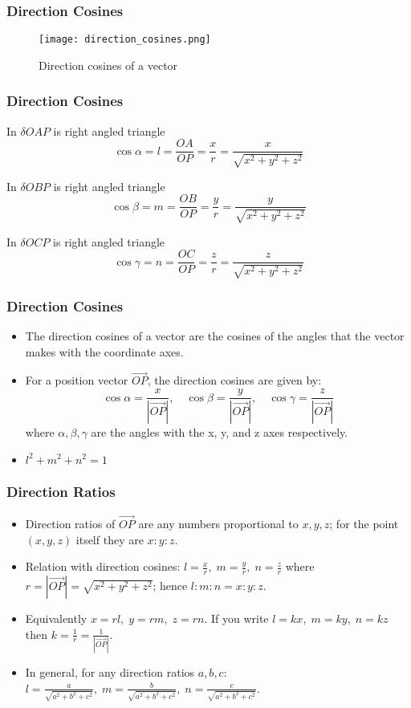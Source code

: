 \begin{frame}
    \frametitle{Direction Cosines}
    \begin{figure}
        \centering
        \texttt{[image: direction\_cosines.png]}
        \caption{Direction cosines of a vector}
    \end{figure}
\end{frame}

\begin{frame}
    \frametitle{Direction Cosines}
    In $\delta OAP$ is right angled triangle 
    \[
    \cos \alpha = l = \frac{OA}{OP}  = \frac{x}{r} = \frac{x}{\sqrt{x^2 + y^2 + z^2}}
    \] 

    In $\delta OBP$ is right angled triangle
    \[
    \cos \beta = m = \frac{OB}{OP}  = \frac{y}{r} = \frac{y}{\sqrt{x^2 + y^2 + z^2}}
    \]

    In $\delta OCP$ is right angled triangle
    \[
    \cos \gamma = n = \frac{OC}{OP}  = \frac{z}{r} = \frac{z}{\sqrt{x^2 + y^2 + z^2}}
    \]
\end{frame}

\begin{frame}
    \frametitle{Direction Cosines}
    \begin{itemize}
        \item The direction cosines of a vector are the cosines of the angles that the vector makes with the coordinate axes.
        \item For a position vector \(\vec{OP}\), the direction cosines are given by:
        \[
        \cos \alpha = \frac{x}{|\vec{OP}|}, \quad \cos \beta = \frac{y}{|\vec{OP}|}, \quad \cos \gamma = \frac{z}{|\vec{OP}|}
        \]
        where \(\alpha, \beta, \gamma\) are the angles with the x, y, and z axes respectively.
        \item \(l^{2} + m^{2} + n^{2} = 1\)
    \end{itemize}
\end{frame}

\begin{frame}
    \frametitle{Direction Ratios}
    \begin{itemize}
        \item Direction ratios of \(\vec{OP}\) are any numbers proportional to \(x,y,z\); for the point \((x,y,z)\) itself they are \(x:y:z\).
        \item Relation with direction cosines: \(l=\frac{x}{r},\; m=\frac{y}{r},\; n=\frac{z}{r}\) where \(r=|\vec{OP}|=\sqrt{x^{2}+y^{2}+z^{2}}\); hence \(l:m:n = x:y:z\).
        \item Equivalently \(x = r l,\; y = r m,\; z = r n\). If you write \(l = kx,\; m = ky,\; n = kz\) then \(k = \tfrac{1}{r} = \tfrac{1}{|\vec{OP}|}\).
        \item In general, for any direction ratios \(a,b,c\): \(l = \frac{a}{\sqrt{a^{2}+b^{2}+c^{2}}},\; m = \frac{b}{\sqrt{a^{2}+b^{2}+c^{2}}},\; n = \frac{c}{\sqrt{a^{2}+b^{2}+c^{2}}}\).
    \end{itemize}
\end{frame}

